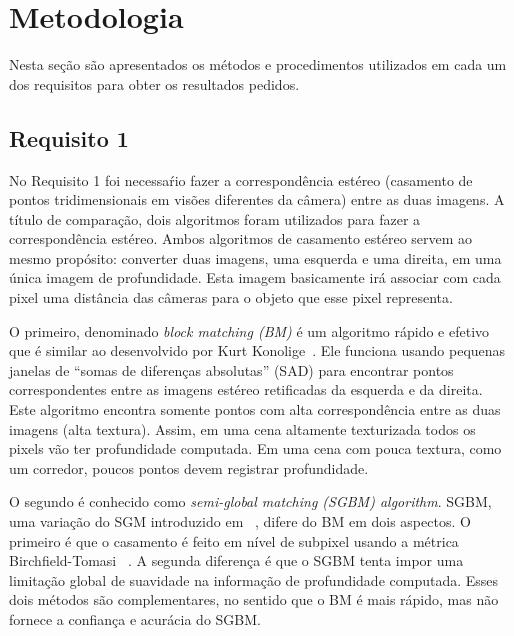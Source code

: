 \documentclass{bmvc2k}
\begin{document}
\section{Metodologia}
\label{sec:Methods}
Nesta seção são apresentados os métodos e procedimentos utilizados em cada um dos requisitos para obter os resultados pedidos.
\subsection{Requisito 1}
No Requisito 1 foi necessaŕio fazer a correspondência estéreo (casamento de pontos tridimensionais em visões diferentes da câmera) entre as duas imagens. A título de comparação, dois algoritmos foram utilizados para fazer a correspondência estéreo. Ambos algoritmos de casamento estéreo servem ao mesmo propósito: converter duas imagens, uma esquerda e uma direita, em uma única imagem de profundidade. Esta imagem basicamente irá associar com cada pixel uma distância das câmeras para o objeto que esse pixel representa.  

O primeiro, denominado \textit{block matching (BM)} é um algoritmo rápido e efetivo que é similar ao desenvolvido por Kurt Konolige~\cite{kurt}. Ele funciona usando pequenas janelas de ``somas de diferenças absolutas'' (SAD) para encontrar pontos correspondentes entre as imagens estéreo retificadas da esquerda e da direita. Este algoritmo encontra somente pontos com alta correspondência entre as duas imagens (alta textura). Assim, em uma cena altamente texturizada todos os pixels vão ter profundidade computada. Em uma cena com pouca textura, como um corredor, poucos pontos devem registrar profundidade. 

O segundo é conhecido como \textit{semi-global matching (SGBM) algorithm}. SGBM, uma variação do SGM introduzido em ~\cite{hirschmullerstereo}, difere do BM em dois aspectos. O primeiro é que o casamento é feito em nível de subpixel usando a métrica Birchfield-Tomasi ~\cite{birchfield1999depth}. A segunda diferença é que o SGBM tenta impor uma limitação global de suavidade na informação de profundidade computada. Esses dois métodos são complementares, no sentido que o BM é mais rápido, mas não fornece a confiança e acurácia do SGBM.
\end{document}
